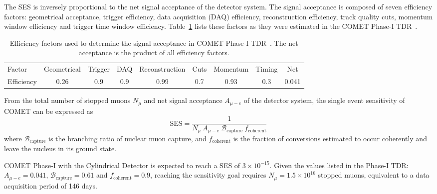The SES is inversely proportional to the net signal acceptance of the detector
system. The signal acceptance is composed of seven efficiency factors:
geometrical acceptance, trigger efficiency, data acquisition (DAQ) efficiency,
reconstruction efficiency, track quality cuts, momentum window efficiency and
trigger time window efficiency. Table~\ref{tab:acceptance} lists these factors as they
were estimated in the COMET Phase-I TDR~\cite[Section
10.1]{the_comet_collaboration_comet_2020}.

\begin{table}
    \centering
    \begin{adjustbox}{max width=1.1\textwidth,center}
    \begin{tabular}{l|ccccccc|c}
        \toprule
        Factor & Geometrical & Trigger & DAQ & Reconstruction & Cuts & Momentum
        & Timing & Net
        \\ 
        Efficiency & 0.26 & 0.9 & 0.9 & 0.99 & 0.7 & 0.93 & 0.3 & 0.041 \\
        \bottomrule
    \end{tabular}
    \end{adjustbox}
    \caption{ Efficiency factors used to determine the signal acceptance in
    COMET Phase-I TDR~\cite{the_comet_collaboration_comet_2020}. The net acceptance
    is the product of all efficiency factors.}
    \label{tab:acceptance} 
\end{table}

From the total number of stopped muons $N_\mu$ and net signal acceptance
$A_{\mu-e}$ of the detector system, the single event sensitivity of COMET can be
expressed as
\begin{equation}
    \mathrm{SES} = \frac{1}{N_\mu \  A_{\mu-e} \  
    \mathcal{B}_\mathrm{capture} \  f_\mathrm{coherent}}
\end{equation}
where $\mathcal{B}_\mathrm{capture}$ is the branching ratio of nuclear muon capture,
and $f_\mathrm{coherent}$ is the fraction of conversions estimated to occur
coherently and leave the nucleus in its ground state.



COMET Phase-I with the Cylindrical Detector is expected to reach a SES of $3
\times 10^{-15}$. Given the values listed in the Phase-I TDR: $A_{\mu-e} =
0.041$, $\mathcal{B}_\mathrm{capture} = 0.61$ and $f_\mathrm{coherent} = 0.9$,
reaching the sensitivity goal requires $N_\mu = 1.5 \times 10^{16}$ stopped
muons, equivalent to a data acquisition period of 146 days.